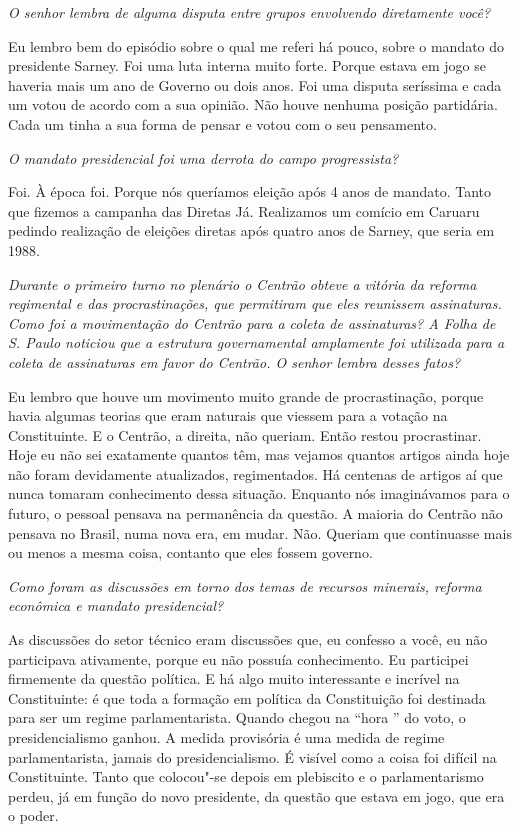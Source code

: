 \medskip

\noindent\emph{O senhor lembra de alguma disputa entre grupos envolvendo
diretamente você?}

Eu lembro bem do episódio sobre o qual me referi há
pouco, sobre o mandato do presidente Sarney. Foi uma luta interna muito
forte. Porque estava em jogo se haveria mais um ano de Governo ou dois
anos. Foi uma disputa seríssima e cada um votou de acordo com a sua
opinião. Não houve nenhuma posição partidária. Cada um tinha a sua forma
de pensar e votou com o seu pensamento.

\medskip

\noindent\emph{O mandato presidencial foi uma derrota do campo progressista?}

Foi. À época foi. Porque nós queríamos eleição após 4
anos de mandato. Tanto que fizemos a campanha das Diretas Já. Realizamos
um comício em Caruaru pedindo realização de eleições diretas após quatro
anos de Sarney, que seria em 1988.

\medskip

\noindent\emph{Durante o primeiro turno no plenário o Centrão obteve a vitória
da reforma regimental e das procrastinações, que permitiram que eles
reunissem assinaturas. Como foi a movimentação do Centrão para a coleta
de assinaturas? A \emph{Folha de S. Paulo} noticiou que a estrutura
governamental amplamente foi utilizada para a coleta de assinaturas em
favor do Centrão. O senhor lembra desses fatos?}

Eu lembro que houve um movimento muito grande de
procrastinação, porque havia algumas teorias que eram naturais que
viessem para a votação na Constituinte. E o Centrão, a direita, não
queriam. Então restou procrastinar. Hoje eu não sei exatamente quantos
têm, mas vejamos quantos artigos ainda hoje não foram devidamente
atualizados, regimentados. Há centenas de artigos aí que nunca tomaram
conhecimento dessa situação. Enquanto nós imaginávamos para o futuro, o
pessoal pensava na permanência da questão. A maioria do Centrão não
pensava no Brasil, numa nova era, em mudar. Não. Queriam que continuasse
mais ou menos a mesma coisa, contanto que eles fossem governo.

\medskip

\noindent\emph{Como foram as discussões em torno dos temas de recursos
minerais, reforma econômica e mandato presidencial?}

As discussões do setor técnico eram discussões que, eu
confesso a você, eu não participava ativamente, porque eu não possuía
conhecimento. Eu participei firmemente da questão política. E há algo
muito interessante e incrível na Constituinte: é que toda a formação em
política da Constituição foi destinada para ser um regime
parlamentarista. Quando chegou na ``hora '' do voto, o presidencialismo
ganhou. A medida provisória é uma medida de regime parlamentarista,
jamais do presidencialismo. É visível como a coisa foi difícil na
Constituinte. Tanto que colocou"-se depois em plebiscito e o
parlamentarismo perdeu, já em função do novo presidente, da questão que
estava em jogo, que era o poder.

